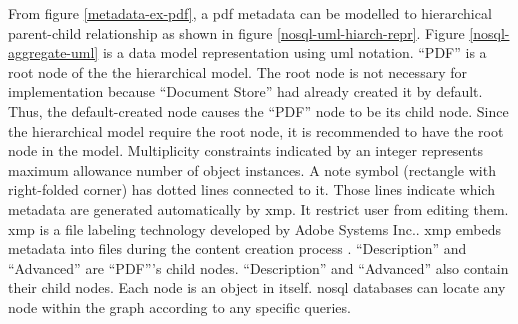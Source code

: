 From figure \ref{metadata-ex-pdf}, a \gls{pdf} metadata can be modelled to hierarchical parent-child relationship as shown in figure \ref{nosql-uml-hiarch-repr}.
Figure \ref{nosql-aggregate-uml} is a data model representation using \gls{uml} notation.
\enquote{PDF} is a root node of the the hierarchical model.
The root node is not necessary for implementation because \enquote{Document Store} had already created it by default.
Thus, the default-created node causes the \enquote{PDF} node to be its child node.
Since the hierarchical model require the root node, it is recommended to have the root node in the model.
Multiplicity constraints indicated by an integer represents maximum allowance number of object instances.
A note symbol (rectangle with right-folded corner) has dotted lines connected to it.
Those lines indicate which metadata are generated automatically by \gls{xmp}.
It restrict user from editing them.
\gls{xmp} is a file labeling technology developed by Adobe Systems Inc..
\gls{xmp} embeds metadata into files during the content creation process \cite{adobe-xml}.
\enquote{Description} and \enquote{Advanced} are \enquote{PDF}'s child nodes.
\enquote{Description} and \enquote{Advanced} also contain their child nodes.
Each node is an object in itself.
\gls{nosql} databases can locate any node within the graph according to any specific queries.
